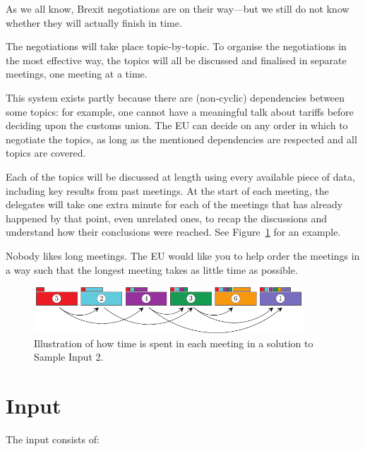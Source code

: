 As we all know, Brexit negotiations are on their way---but we still do not know
whether they will actually finish in time.

The negotiations will take place topic-by-topic. To organise the negotiations
in the most effective way, the topics will all be discussed and finalised in
separate meetings, one meeting at a time.

This system exists partly because there are (non-cyclic) dependencies between
some topics: for example, one cannot have a meaningful talk about tariffs
before deciding upon the customs union.
The EU can decide on any order in which to negotiate the topics, as long as the
mentioned dependencies are respected and all topics are covered.

Each of the topics will be discussed at length using every available piece of
data, including key results from past meetings. At the start of each meeting,
the delegates will take one extra minute for each of the meetings that has already
happened by that point, even unrelated ones, to recap the discussions and
understand how their conclusions were reached. See Figure~\ref{fig:brexit} for an example.

Nobody likes long meetings. The EU would like you to help order the meetings in
a way such that the longest meeting takes as little time as possible.

\begin{figure}[h!]
  \centering
  \includegraphics[width=0.9\textwidth]{sample1}
  \caption{Illustration of how time is spent in each meeting in a solution to Sample Input 2.}
  \label{fig:brexit}
\end{figure}

\section*{Input}

The input consists of:

